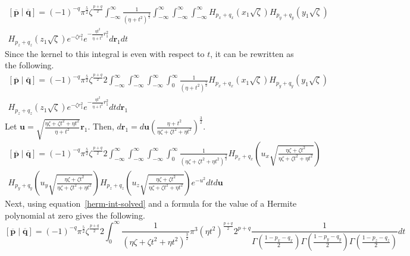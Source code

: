 \begin{multline}
  \left[\overline{\mathbf{p}}\middle|\overline{\mathbf{q}}\right] = (-1)^{-q} \pi^{\frac{5}{2}} \zeta^{\frac{p + q}{2}} \int_{-\infty}^\infty \frac{1}{\left(\eta + t^2\right)^{\frac{3}{2}}} \int_{-\infty}^\infty \int_{-\infty}^\infty \int_{-\infty}^\infty H_{p_x + q_x}\left(x_1\sqrt{\zeta}\right)H_{p_y + q_y}\left(y_1\sqrt{\zeta}\right)\\
  H_{p_z + q_z}\left(z_1\sqrt{\zeta}\right) e^{-\zeta r_1^2}e^{-\frac{\eta t^2}{\eta + t^2}r_1^2} d\mathbf{r}_1 dt
\end{multline}
Since the kernel to this integral is even with respect to $t$, it can be rewritten as the following.
\begin{multline}
  \left[\overline{\mathbf{p}}\middle|\overline{\mathbf{q}}\right] = (-1)^{-q} \pi^{\frac{5}{2}} \zeta^{\frac{p + q}{2}} 2\int_{-\infty}^\infty \int_{-\infty}^\infty \int_{-\infty}^\infty \int_{0}^\infty \frac{1}{\left(\eta + t^2\right)^{\frac{3}{2}}} H_{p_x + q_x}\left(x_1\sqrt{\zeta}\right)H_{p_y + q_y}\left(y_1\sqrt{\zeta}\right)\\
  H_{p_z + q_z}\left(z_1\sqrt{\zeta}\right) e^{-\zeta r_1^2}e^{-\frac{\eta t^2}{\eta + t^2}r_1^2} dt d\mathbf{r}_1
\end{multline}
Let $\mathbf{u} = \sqrt{\frac{\eta\zeta + \zeta t^2 + \eta t^2}{\eta + t^2}}\mathbf{r}_1$. Then, $d\mathbf{r}_1 = d\mathbf{u}\left(\frac{\eta + t^2}{\eta\zeta + \zeta t^2 + \eta t^2}\right)^{\frac{3}{2}}$.\
\begin{multline}
  \left[\overline{\mathbf{p}}\middle|\overline{\mathbf{q}}\right] = (-1)^{-q} \pi^{\frac{5}{2}} \zeta^{\frac{p + q}{2}} 2\int_{-\infty}^\infty \int_{-\infty}^\infty \int_{-\infty}^\infty \int_{0}^\infty \frac{1}{\left(\eta\zeta + \zeta t^2 + \eta t^2\right)^{\frac{3}{2}}} H_{p_x + q_x}\left(u_x\sqrt{\frac{\eta\zeta + \zeta t^2}{\eta\zeta + \zeta t^2 + \eta t^2}}\right)\\
  H_{p_y + q_y}\left(u_y\sqrt{\frac{\eta\zeta + \zeta t^2}{\eta\zeta + \zeta t^2 + \eta t^2}}\right) H_{p_z + q_z}\left(u_z\sqrt{\frac{\eta\zeta + \zeta t^2}{\eta\zeta + \zeta t^2 + \eta t^2}}\right) e^{-u^2} dt d\mathbf{u}
\end{multline}
Next, using equation~\ref{herm-int-solved} and a formula for the value of a Hermite polynomial at zero gives the following.
\begin{equation}
  \left[\overline{\mathbf{p}}\middle|\overline{\mathbf{q}}\right] = (-1)^{-q} \pi^{\frac{5}{2}} \zeta^{\frac{p + q}{2}} 2\int_{0}^\infty \frac{1}{\left(\eta\zeta + \zeta t^2 + \eta t^2\right)^{\frac{3}{2}}} \pi^{3}\left(\eta t^2\right)^{\frac{p + q}{2}}2^{p + q} \frac{1}{\Gamma\left(\frac{1 - p_x - q_x}{2}\right)\Gamma\left(\frac{1 - p_y - q_y}{2}\right)\Gamma\left(\frac{1 - p_z - q_z}{2}\right)}dt
\end{equation}
